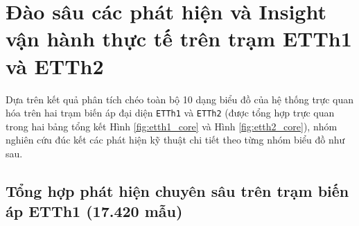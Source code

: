 \documentclass[12pt,a4paper,oneside]{report}
\newcommand{\code}[1]{\texttt{#1}}
\begin{document}
\section{Đào sâu các phát hiện và Insight vận hành thực tế trên trạm ETTh1 và ETTh2}

Dựa trên kết quả phân tích chéo toàn bộ 10 dạng biểu đồ của hệ thống trực quan hóa trên hai trạm biến áp đại diện \code{ETTh1} và \code{ETTh2} (được tổng hợp trực quan trong hai bảng tổng kết Hình \ref{fig:etth1_core} và Hình \ref{fig:etth2_core}), nhóm nghiên cứu đúc kết các phát hiện kỹ thuật chi tiết theo từng nhóm biểu đồ như sau.

\subsection{Tổng hợp phát hiện chuyên sâu trên trạm biến áp ETTh1 (17.420 mẫu)}
\end{document}
